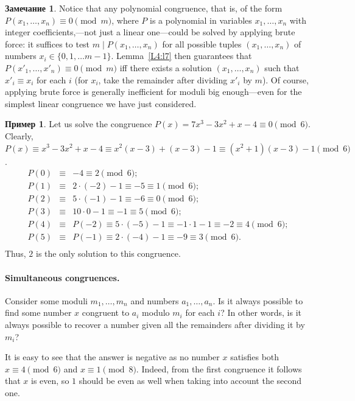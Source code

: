 \documentclass[12pt,notitlepage]{article}
\theoremstyle{plain}
\theoremstyle{definition}
\newtheorem{exm}[thm]{Пример}
\newtheorem{rem}[thm]{Замечание}
\theoremstyle{plain}
\newcommand{\1}{\mathbf{1}}
\newcommand{\0}{\mathbf{0}}
\newcommand{\dvd}{\mathop{\mid}}
\begin{document}
\begin{rem}
	Notice that any polynomial congruence, that is, of the form $P(x_1,\ldots,x_n) \equiv 0 \pmod m$, where $P$ is a polynomial in variables $x_1,\ldots,x_n$ with integer coefficients,---not just a linear one---could be solved by applying brute force: it suffices to test $m \dvd P(x_1,\ldots,x_n)$ for all possible tuples $(x_1,\ldots,x_n)$ of numbers $x_i \in \{0, 1,\ldots m - 1\}$. Lemma~\ref{L4:l7} then guarantees that $P(x'_1,\ldots,x'_n) \equiv 0 \pmod m$ iff there exists a solution $(x_1,\ldots,x_n)$ such that $x'_i \equiv x_i$ for each $i$ (for $x_i$, take the remainder after dividing $x'_i$ by $m$). Of course, applying brute force is generally inefficient for moduli big enough---even for the simplest linear congruence we have just considered.
\end{rem}

\begin{exm}
	Let us solve the congruence $P(x) = 7x^3 - 3x^2 + x - 4 \equiv 0 \pmod 6$. Clearly, $P(x) \equiv x^3 - 3x^2 + x - 4 \equiv x^2(x - 3) + (x - 3) - 1 \equiv (x^2 + 1)(x-3) - 1 \pmod 6$.
	$$
	\begin{array}{rcl}
		P(0) &\equiv& -4 \equiv 2 \pmod 6;\\
		P(1) &\equiv& 2\cdot(-2) - 1 \equiv -5 \equiv 1 \pmod 6;\\
		P(2) &\equiv& 5\cdot(-1) - 1 \equiv -6 \equiv 0 \pmod 6;\\
		P(3) &\equiv& 10\cdot 0 - 1 \equiv -1 \equiv 5 \pmod 6;\\
		P(4) &\equiv& P(-2) \equiv 5\cdot (-5) - 1 \equiv -1 \cdot 1 - 1 \equiv -2 \equiv 4 \pmod 6;\\
		P(5) &\equiv& P(-1) \equiv 2\cdot (-4) - 1 \equiv -9 \equiv 3 \pmod 6.\\
	\end{array}
	$$
	Thus, $2$ is the only solution to this congruence.
\end{exm}

\paragraph{Simultaneous congruences.} Consider some moduli $m_1, \ldots, m_n$ and numbers $a_1, \ldots, a_n$. Is it always possible to find some number $x$ congruent to $a_i$ modulo $m_i$ for each $i$? In other words, is it always possible to recover a number given all the remainders after dividing it by $m_i$?

It is easy to see that the answer is negative as no number $x$ satisfies both $x \equiv 4 \pmod {6}$ and  $x \equiv 1 \pmod {8}$. Indeed, from the first congruence it follows that $x$ is even, so $1$ should be even as well when taking into account the second one.
\end{document}
